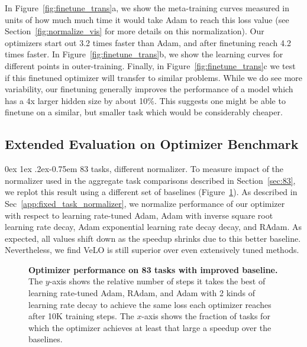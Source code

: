 \documentclass[11pt]{article}
\makeatletter
\renewcommand{\paragraph}{%
  \@startsection{paragraph}{4}%
  {\z@}{0ex \@plus 1ex \@minus .2ex}{-0.75em}%
  {\normalfont\normalsize\bfseries}%
}
\makeatother
\begin{document}
In Figure~\ref{fig:finetune_trans}a, we show the meta-training curves measured in units of how much much time it would take Adam to reach this loss value (see Section~\ref{fig:normalize_vis} for more details on this normalization).
Our optimizers start out 3.2 times faster than Adam, and after finetuning reach 4.2 times faster.
In Figure~\ref{fig:finetune_trans}b, we show the learning curves for different points in outer-training.
Finally, in Figure~\ref{fig:finetune_trans}c we test if this finetuned optimizer will transfer to similar problems.
While we do see more variability, our finetuning generally improves the performance of a model which has a 4x larger hidden size by about 10\%. This suggests one might be able to finetune on a similar, but smaller task which would be considerably cheaper.

\subsection{Extended Evaluation on Optimizer Benchmark} \label{app:extended_opt_benchmark}
\paragraph{83 tasks, different normalizer.}
To measure impact of the normalizer used in the aggregate task comparisons described in Section~\ref{sec:83}, we replot this result using a different set of baselines (Figure~\ref{fig:aggregate_multitask_better_norm}).
As described in Sec~\ref{app:fixed_task_normalizer}, we normalize performance of our optimizer with respect to learning rate-tuned Adam, Adam with inverse square root learning rate decay, Adam exponential learning rate decay decay, and RAdam. 
As expected, all values shift down as the speedup shrinks due to this better baseline. Nevertheless, we find VeLO is still superior over even extensively tuned methods. 

\begin{figure}[t!]
    \centering
    \caption{\textbf{Optimizer performance on 83 tasks with improved baseline.} The $y$-axis shows the relative number of steps it takes the best of learning rate-tuned Adam, RAdam, and Adam with 2 kinds of learning rate decay to achieve the same loss each optimizer reaches after 10K training steps.
    The $x$-axis shows the fraction of tasks for which the optimizer achieves at least that large a speedup over the baselines.
    \label{fig:aggregate_multitask_better_norm}
    }
\end{figure}
\end{document}
